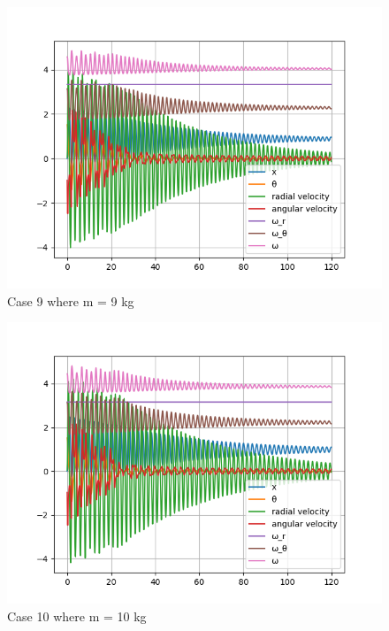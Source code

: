 \begin{figure}[H]
    \centering
    \includegraphics[width=15cm]{ExpPictures/m9.png}
    \caption{{Case 9 where m = 9 kg}}
    \label{}
\end{figure}
        
\begin{figure}[H]
    \centering
    \includegraphics[width=15cm]{ExpPictures/m10.png}
    \caption{{Case 10 where m = 10 kg}}
    \label{}
\end{figure}
        





